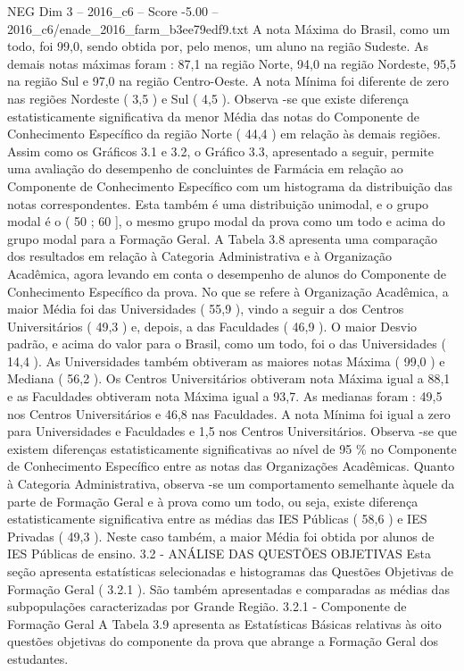 \begin{textsample}{NEG Dim 3 – 2016\_c6 – Score -5.00 – 2016\_c6/enade\_2016\_farm\_b3ee79edf9.txt}
A nota Máxima do Brasil, como um todo, foi 99,0, sendo obtida por, pelo menos, um aluno na região Sudeste.
As demais notas máximas foram : 87,1 na região Norte, 94,0 na região Nordeste, 95,5 na região Sul e 97,0 na região Centro-Oeste.
A nota Mínima foi diferente de zero nas regiões Nordeste ( 3,5 ) e Sul ( 4,5 ).
Observa -se que existe diferença estatisticamente significativa da menor Média das notas do Componente de Conhecimento Específico da região Norte ( 44,4 ) em relação às demais regiões.
Assim como os Gráficos 3.1 e 3.2, o Gráfico 3.3, apresentado a seguir, permite uma avaliação do desempenho de concluintes de Farmácia em relação ao Componente de Conhecimento Específico com um histograma da distribuição das notas correspondentes.
Esta também é uma distribuição unimodal, e o grupo modal é o ( 50 ; 60 ], o mesmo grupo modal da prova como um todo e acima do grupo modal para a Formação Geral.
A Tabela 3.8 apresenta uma comparação dos resultados em relação à Categoria Administrativa e à Organização Acadêmica, agora levando em conta o desempenho de alunos do Componente de Conhecimento Específico da prova.
No que se refere à Organização Acadêmica, a maior Média foi das Universidades ( 55,9 ), vindo a seguir a dos Centros Universitários ( 49,3 ) e, depois, a das Faculdades ( 46,9 ).
O maior Desvio padrão, e acima do valor para o Brasil, como um todo, foi o das Universidades ( 14,4 ).
As Universidades também obtiveram as maiores notas Máxima ( 99,0 ) e Mediana ( 56,2 ).
Os Centros Universitários obtiveram nota Máxima igual a 88,1 e as Faculdades obtiveram nota Máxima igual a 93,7.
As medianas foram : 49,5 nos Centros Universitários e 46,8 nas Faculdades.
A nota Mínima foi igual a zero para Universidades e Faculdades e 1,5 nos Centros Universitários.
Observa -se que existem diferenças estatisticamente significativas ao nível de 95 \% no Componente de Conhecimento Específico entre as notas das Organizações Acadêmicas.
Quanto à Categoria Administrativa, observa -se um comportamento semelhante àquele da parte de Formação Geral e à prova como um todo, ou seja, existe diferença estatisticamente significativa entre as médias das IES Públicas ( 58,6 ) e IES Privadas ( 49,3 ).
Neste caso também, a maior Média foi obtida por alunos de IES Públicas de ensino. 3.2 - ANÁLISE DAS QUESTÕES OBJETIVAS Esta seção apresenta estatísticas selecionadas e histogramas das Questões Objetivas de Formação Geral ( 3.2.1 ).
São também apresentadas e comparadas as médias das subpopulações caracterizadas por Grande Região. 3.2.1 - Componente de Formação Geral A Tabela 3.9 apresenta as Estatísticas Básicas relativas às oito questões objetivas do componente da prova que abrange a Formação Geral dos estudantes.

\end{textsample}

